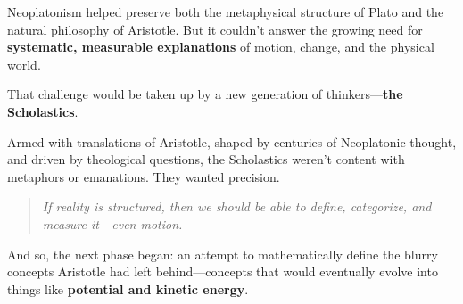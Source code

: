 Neoplatonism helped preserve both the metaphysical structure of Plato and the natural philosophy of Aristotle. But it couldn’t answer the growing need for \textbf{systematic, measurable explanations} of motion, change, and the physical world.

That challenge would be taken up by a new generation of thinkers—\textbf{the Scholastics}.

Armed with translations of Aristotle, shaped by centuries of Neoplatonic thought, and driven by theological questions, the Scholastics weren’t content with metaphors or emanations. They wanted precision.

\begin{quote}
    \textit{If reality is structured, then we should be able to define, categorize, and measure it—even motion.}
\end{quote}

And so, the next phase began: an attempt to mathematically define the blurry concepts Aristotle had left behind—concepts that would eventually evolve into things like \textbf{potential and kinetic energy}.
